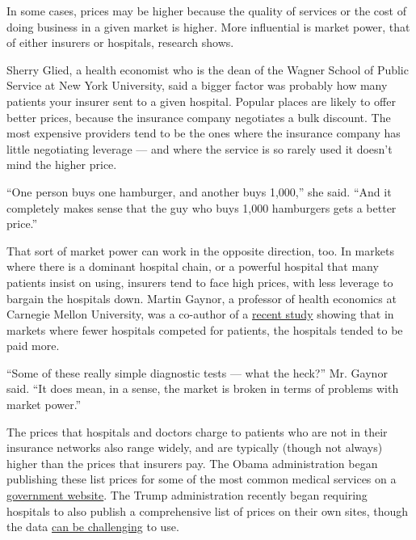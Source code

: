 In some cases, prices may be higher because the quality of services or
the cost of doing business in a given market is higher. More influential
is market power, that of either insurers or hospitals, research shows.

Sherry Glied, a health economist who is the dean of the Wagner School of
Public Service at New York University, said a bigger factor was probably
how many patients your insurer sent to a given hospital. Popular places
are likely to offer better prices, because the insurance company
negotiates a bulk discount. The most expensive providers tend to be the
ones where the insurance company has little negotiating leverage --- and
where the service is so rarely used it doesn't mind the higher price.

``One person buys one hamburger, and another buys 1,000,'' she said.
``And it completely makes sense that the guy who buys 1,000 hamburgers
gets a better price.''

That sort of market power can work in the opposite direction, too. In
markets where there is a dominant hospital chain, or a powerful hospital
that many patients insist on using, insurers tend to face high prices,
with less leverage to bargain the hospitals down. Martin Gaynor, a
professor of health economics at Carnegie Mellon University, was a
co-author of a
\href{https://academic.oup.com/qje/article-abstract/134/1/51/5090426?redirectedFrom=fulltext}{recent
study} showing that in markets where fewer hospitals competed for
patients, the hospitals tended to be paid more.

``Some of these really simple diagnostic tests --- what the heck?'' Mr.
Gaynor said. ``It does mean, in a sense, the market is broken in terms
of problems with market power.''

The prices that hospitals and doctors charge to patients who are not in
their insurance networks also range widely, and are typically (though
not always) higher than the prices that insurers pay. The Obama
administration began publishing these list prices for some of the most
common medical services on a
\href{https://www.cms.gov/Research-Statistics-Data-and-Systems/Statistics-Trends-and-Reports/Medicare-Provider-Charge-Data/index.html}{government
website}. The Trump administration recently began requiring hospitals to
also publish a comprehensive list of prices on their own sites, though
the data
\href{https://www.nytimes3xbfgragh.onion/2019/01/13/us/politics/hospital-prices-online.html}{can
be challenging} to use.

